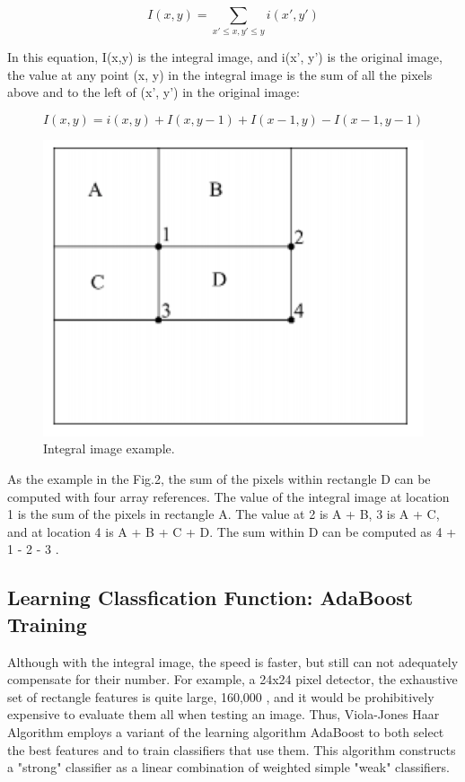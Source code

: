 \documentclass[conference]{IEEEtran}
\begin{document}
\begin{equation}
 I(x,y) = \sum_{x'\leq x,y'\leq y}^{}i(x',y')
\end{equation}

In this equation, I(x,y) is the integral image, and i(x', y') is the original image, the value at any point (x, y) in the integral image is the sum of all the pixels above and to the left of (x', y') in the original image:

\begin{equation}
  I(x,y)=i(x,y)+I(x,y-1)+I(x-1,y)-I(x-1,y-1)
\end{equation}

\begin{figure}[htbp]
  \centerline{\includegraphics[scale=0.5]{./image/Integral_Image.png}}
  \caption{Integral image example.}
  \label{fig}
\end{figure}

As the example in the Fig.2, the sum of the pixels within rectangle D can be computed with four array references. The value of the integral image at location 1 is the sum of the pixels in rectangle A. The value at 2 is A + B, 3 is A + C, and at location 4 is A + B + C + D. The sum within D can be computed as 4 + 1 - 2 - 3 \cite{b2}.

\subsection{Learning Classfication Function: AdaBoost Training}
Although with the integral image, the speed is faster, but still can not adequately compensate for their number. For example, a 24x24 pixel detector, the exhaustive set of rectangle features is quite large, 160,000 \cite{b2}, and it would be prohibitively expensive to evaluate them all when testing an image. Thus, Viola-Jones Haar Algorithm employs a variant of the learning algorithm AdaBoost to both select the best features and to train classifiers that use them. This algorithm constructs a "strong" classifier as a linear combination of weighted simple "weak" classifiers.
\end{document}
